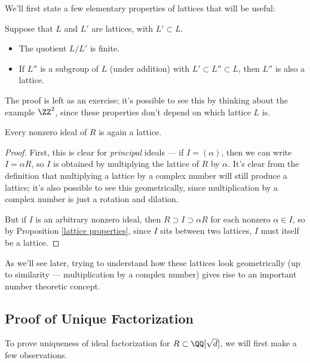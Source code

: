 We'll first state a few elementary properties of lattices that will be useful:

\begin{proposition} \label{lattice properties}
    Suppose that $L$ and $L'$ are lattices, with $L' \subset L$. 
    \begin{itemize}
        \item The quotient $L/L'$ is finite. 
        \item If $L''$ is a subgroup of $L$ (under addition) with $L' \subset L'' \subset L$, then $L''$ is also a lattice. 
    \end{itemize} 
\end{proposition}

The proof is left as an exercise; it's possible to see this by thinking about the example $\ZZ^2$, since these properties don't depend on which lattice $L$ is. 

\begin{corollary}
Every nonzero ideal of $R$ is again a lattice. 
\end{corollary}

\begin{proof}
    First, this is clear for \emph{principal} ideals --- if $I = (\alpha)$, then we can write $I = \alpha R$, so $I$ is obtained by multiplying the lattice of $R$ by $\alpha$. It's clear from the definition that multiplying a lattice by a complex number will still produce a lattice; it's also possible to see this geometrically, since multiplication by a complex number is just a rotation and dilation.
    
    But if $I$ is an arbitrary nonzero ideal, then $R \supset I \supset \alpha R$ for each nonzero $\alpha \in I$, so by Proposition \ref{lattice properties}, since $I$ sits between two lattices, $I$ must itself be a lattice. 
\end{proof}

\begin{note}
    As we'll see later, trying to understand how these lattices look geometrically (up to similarity --- multiplication by a complex number) gives rise to an important number theoretic concept. 
\end{note}

\subsection{Proof of Unique Factorization}

To prove uniqueness of ideal factorization for $R \subset \QQ[\sqrt{d}]$, we will first make a few observations. 

